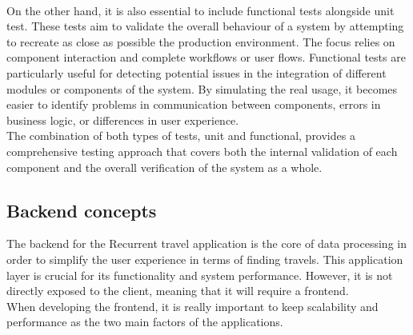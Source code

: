 \documentclass[../memory.tex]{subfiles}
\begin{document}
\\
On the other hand, it is also essential to include functional tests alongside
unit test. These tests aim to validate the overall behaviour of a system by
attempting to recreate as close as possible the production environment. The
focus relies on component interaction and complete workflows or user flows.
Functional tests are particularly useful for detecting potential issues in the
integration of different modules or components of the system. By simulating the
real usage, it becomes easier to identify problems in communication between
components, errors in business logic, or differences in user experience.
\\
The combination of both types of tests, unit and functional, provides a
comprehensive testing approach that covers both the internal validation of each
component and the overall verification of the system as a whole.
\subsection{Backend concepts}
The backend for the Recurrent travel application is the core of data processing
in order to simplify the user experience in terms of finding travels. This
application layer is crucial for its functionality and system performance.
However, it is not directly exposed to the client, meaning that it will require
a frontend.
\\
When developing the frontend, it is really important to keep scalability and
performance as the two main factors of the applications.
\end{document}
